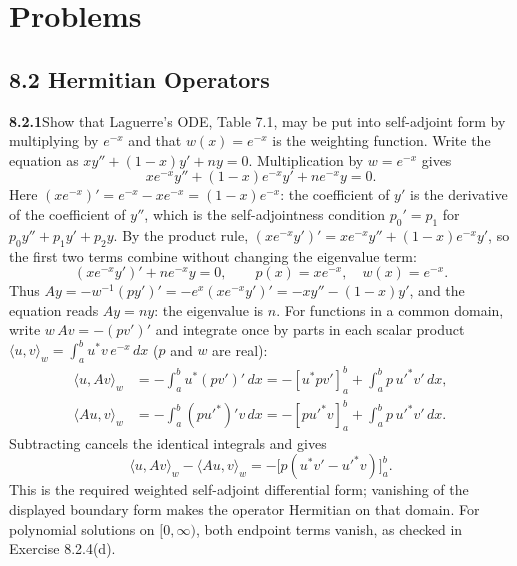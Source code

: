 
\section*{Problems}

\subsection*{8.2 Hermitian Operators}

\par\bigskip
\noindent\textbf{8.2.1}\quad Show that Laguerre's ODE, Table 7.1, may be put
into self-adjoint form by multiplying by $e^{-x}$ and that $w(x)=e^{-x}$ is
the weighting function.
\solution
Write the equation as $xy''+(1-x)y'+ny=0$.  Multiplication by
$w=e^{-x}$ gives
\[
xe^{-x}y''+(1-x)e^{-x}y'+ne^{-x}y=0.
\]
Here $(xe^{-x})'=e^{-x}-xe^{-x}=(1-x)e^{-x}$: the coefficient of $y'$
is the derivative of the coefficient of $y''$, which is the
self-adjointness condition $p_0'=p_1$ for $p_0y''+p_1y'+p_2y$.  By the
product rule, $(xe^{-x}y')'=xe^{-x}y''+(1-x)e^{-x}y'$, so the first two
terms combine without changing the eigenvalue term:
\[
\boxed{(xe^{-x}y')'+ne^{-x}y=0},\qquad
p(x)=xe^{-x},\quad w(x)=e^{-x}.
\]
Thus $A y=-w^{-1}(py')'=-e^{x}(xe^{-x}y')'=-xy''-(1-x)y'$, and the
equation reads $Ay=ny$: the eigenvalue is $n$.
For functions in a common domain, write $w\,Av=-(pv')'$ and integrate
once by parts in each scalar product
$\langle u,v\rangle_w=\int_a^b u^*v\,e^{-x}\,dx$ ($p$ and $w$ are real):
\begin{align*}
\langle u,Av\rangle_w
&=-\int_a^b u^*(pv')'\,dx
=-[u^*pv']_a^b+\int_a^b p\,u'^*v'\,dx,\\
\langle Au,v\rangle_w
&=-\int_a^b(pu'^*)'v\,dx
=-[pu'^*v]_a^b+\int_a^b p\,u'^*v'\,dx.
\end{align*}
Subtracting cancels the identical integrals and gives
\[
\langle u,Av\rangle_w-\langle Au,v\rangle_w
=-\bigl[p(u^*v'-u'^*v)\bigr]_a^b.
\]
This is the required weighted self-adjoint differential form; vanishing
of the displayed boundary form makes the operator Hermitian on that domain.
For polynomial solutions on $[0,\infty)$, both endpoint terms vanish,
as checked in Exercise 8.2.4(d).


